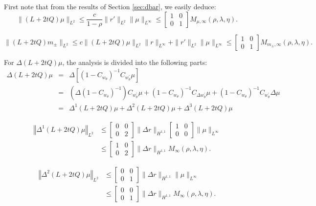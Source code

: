 \documentclass{amsart}
\theoremstyle{plain}
\theoremstyle{remark}
\numberwithin{equation}{section}
\newcommand{\norm}[2]{\left\Vert #1\right\Vert_{#2}}
\newcommand{\Twomat}[4]
{
\left[
	\begin{array}{cc}
		{#1}	&	{#2}	\\[10pt]
		{#3}	&	{#4}
		\end{array}
\right]
}
\begin{document}
First note that from the results of Section \ref{sec:dbar}, we easily deduce:
\begin{equation}
\label{eq:tildeLmu}
 \|(L+2tQ)\mu\|_{L^2} \leq \frac{c}{1-\rho} \| r'\|_{L^2}\|\mu\|_{L^\infty}
    \leq \Twomat{1}{0}{0}{1} M_{\mu,\infty}(\rho,\lambda, \eta).
\end{equation}

\begin{equation}
\label{eq:tildeLm}
 \|(L+2tQ)m_{\pm}\|_{L^2} \leq c \|(L+2tQ)\mu\|_{L^2}\|r\|_{L^\infty}+\| r'\|_{L^2}\|\mu\|_{L^\infty}
    \leq \Twomat{1}{0}{0}{1} M_{m_{\pm},\infty}(\rho,\lambda, \eta).
\end{equation}

For $\Delta (L+2tQ)\mu$, the analysis is divided into the following parts:
\begin{eqnarray*}
    \Delta (L+2tQ)\mu & =& \Delta \left[\left(1-C_{w_\theta}\right)^{-1} C_{w_\theta^{\prime}} \mu\right]\\
    &=& \left(\Delta\left(1-C_{w_\theta}\right)^{-1}\right) C_{w_\theta^{\prime}} \mu+\left(1-C_{w_\theta}\right)^{-1} C_{\Delta w_\theta^{\prime}} \mu+\left(1-C_{w_\theta}\right)^{-1} C_{w_\theta^{\prime}} \Delta \mu \\
    &=&  \Delta^1 (L+2tQ)\mu+\Delta^2 (L+2tQ)\mu+\Delta^3(L+2tQ)\mu
    \end{eqnarray*}

\begin{align}
\norm{\Delta^1 (L+2tQ)\mu}{L^2} &\leq\Twomat{0}{0}{0}{2}\|\Delta r\|_{H^{1,1}}\Twomat{1}{0}{0}{0}\|\mu\|_{L^\infty}\\
\nonumber
 &\leq \Twomat{1}{0}{0}{2}\|\Delta r\|_{H^{1,1}} M_{\infty}(\rho,\lambda, \eta).
\end{align}


\begin{align}
\norm{\Delta^2 (L+2tQ)\mu}{L^2} &\leq\Twomat{0}{0}{0}{1}\|\Delta r\|_{H^{1,1}}\|\mu\|_{L^\infty}\\
\nonumber
 &\leq \Twomat{0}{0}{0}{1}\|\Delta r\|_{H^{1,1}} M_{\infty}(\rho,\lambda, \eta).
\end{align}
\end{document}
